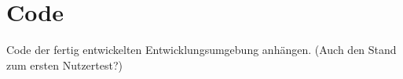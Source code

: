 \chapter{Code}

Code der fertig entwickelten Entwicklungsumgebung anhängen. (Auch den Stand zum ersten Nutzertest?)
